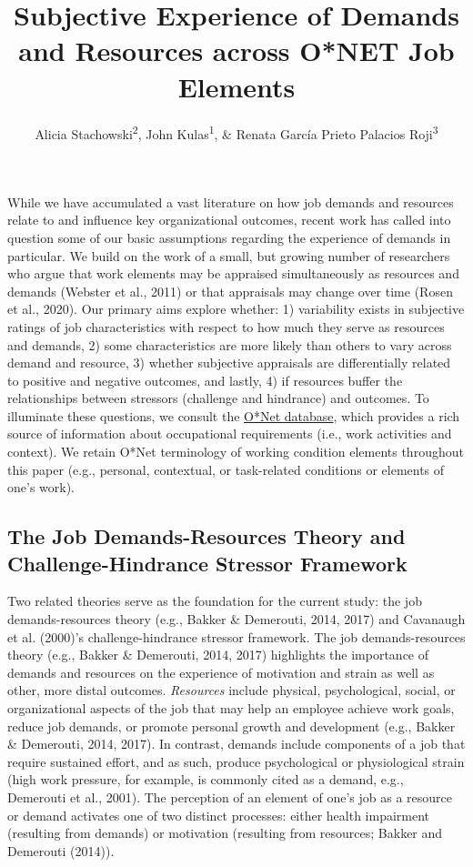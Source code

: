 \documentclass[
  man,mask]{apa7}
\title{Subjective Experience of Demands and Resources across O*NET Job Elements}
\author{Alicia Stachowski\textsuperscript{2}, John Kulas\textsuperscript{1}, \& Renata García Prieto Palacios Roji\textsuperscript{3}}
\date{}
\affiliation{\vspace{0.5cm}\textsuperscript{1} eRg\\\textsuperscript{2} University of Wisconsin - Stout\\\textsuperscript{3} PepsiCo}
\begin{document}
\maketitle

While we have accumulated a vast literature on how job demands and resources relate to and influence key organizational outcomes, recent work has called into question some of our basic assumptions regarding the experience of demands in particular. We build on the work of a small, but growing number of researchers who argue that work elements may be appraised simultaneously as resources and demands (Webster et al., 2011) or that appraisals may change over time (Rosen et al., 2020). Our primary aims explore whether: 1) variability exists in subjective ratings of job characteristics with respect to how much they serve as resources and demands, 2) some characteristics are more likely than others to vary across demand and resource, 3) whether subjective appraisals are differentially related to positive and negative outcomes, and lastly, 4) if resources buffer the relationships between stressors (challenge and hindrance) and outcomes. To illuminate these questions, we consult the \href{https://www.onetcenter.org/content.html}{O*Net database}, which provides a rich source of information about occupational requirements (i.e., work activities and context). We retain O*Net terminology of working condition elements throughout this paper (e.g., personal, contextual, or task-related conditions or elements of one's work).

\hypertarget{the-job-demands-resources-theory-and-challenge-hindrance-stressor-framework}{%
\subsection{The Job Demands-Resources Theory and Challenge-Hindrance Stressor Framework}\label{the-job-demands-resources-theory-and-challenge-hindrance-stressor-framework}}

Two related theories serve as the foundation for the current study: the job demands-resources theory (e.g., Bakker \& Demerouti, 2014, 2017) and Cavanaugh et al. (2000)'s challenge-hindrance stressor framework. The job demands-resources theory (e.g., Bakker \& Demerouti, 2014, 2017) highlights the importance of demands and resources on the experience of motivation and strain as well as other, more distal outcomes. \emph{Resources} include physical, psychological, social, or organizational aspects of the job that may help an employee achieve work goals, reduce job demands, or promote personal growth and development (e.g., Bakker \& Demerouti, 2014, 2017). In contrast, demands include components of a job that require sustained effort, and as such, produce psychological or physiological strain (high work pressure, for example, is commonly cited as a demand, e.g., Demerouti et al., 2001). The perception of an element of one's job as a resource or demand activates one of two distinct processes: either health impairment (resulting from demands) or motivation (resulting from resources; Bakker and Demerouti (2014)).
\end{document}
